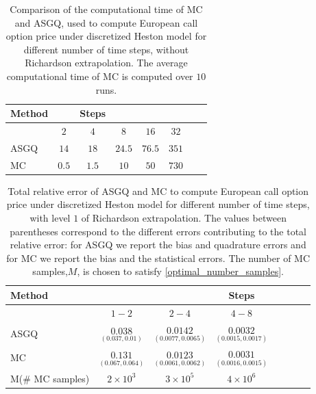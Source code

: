 \begin{table}[h!]
	\centering
	\begin{tabular}{l*{6}{c}r}
		\toprule[1.5pt]
	Method & & Steps  & &      &\\
	\hline
	         & $2$ & $4$ & $8$  & $16$  & $32$   \\
		\hline
		ASGQ & $14$  & $18$ & $24.5$ & $76.5$     & $351$    \\
				MC  &   $0.5$& $1.5$ &   $10$&   $50$&   $730$  \\
		\bottomrule[1.25pt]
	\end{tabular}
	\caption{Comparison of the computational time of  MC and ASGQ, used to compute European call option price under discretized Heston model for different number of time steps, without Richardson extrapolation. The average computational time of MC is computed over $10$ runs.}
	\label{Comparsion of the computational time of  MC and MISC, used to compute European call option price under discretized Heston model for different number of time steps, without Richardson extrapolation}
\end{table}
\FloatBarrier



\begin{table}[h!]
	\centering
	\begin{tabular}{l*{6}{c}r}
		\toprule[1.5pt]
	Method & &   &Steps &  &   &    \\
	\hline
           & $1-2$ & $2-4$  & $4-8$   \\
		\hline
		ASGQ   &  $\underset{(0.037,0.01)}{\mathbf{0.038}}$ & $\underset{(0.0077,0.0065)}{\mathbf{0.0142}}$  & $\underset{(0.0015,0.0017)}{\mathbf{0.0032}}$ \\
		\hline
						MC   &  $\underset{(0.067,0.064)}{\mathbf{0.131}}$ & $\underset{(0.0061,0.0062)}{\mathbf{0.0123}}$ & $\underset{(0.0016,0.0015)}{\mathbf{0.0031}}$  \\ 
				M(\# MC samples)   &$2 \times 10^3$  &$3 \times 10^5$  &$4 \times 10^6$   \\	
			\bottomrule[1.25pt]
	\end{tabular}
	\caption{Total relative  error of ASGQ and MC to compute European call option price under discretized Heston model for different number of time steps, with level $1$ of Richardson extrapolation. The values between parentheses correspond to the different errors contributing to the total relative error: for ASGQ we report the bias and quadrature errors and for MC we report the bias and the statistical errors. The number of MC samples,$ M$, is chosen to satisfy \eqref{optimal_number_samples}.}
	\label{Total relative  error of ASGQ  to compute European call option price under discretized Heston model for different number of time steps, with level $1$ of Richardson extrapolation. The values between parentheses correspond to the different errors contributing to the total relative error: for ASGQ we report the bias and quadrature errors.}
\end{table}
\FloatBarrier


